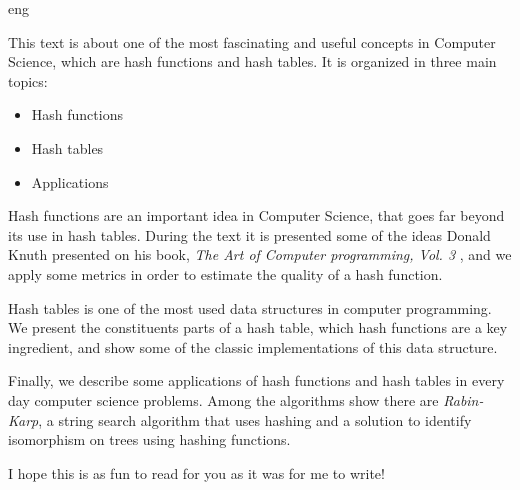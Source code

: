 \begin{resumo}{eng}
  
This text is about one of the most fascinating and useful concepts in Computer Science, which are hash functions and hash tables. It is organized in three main topics:

\begin{itemize}
   \item Hash functions
   \item Hash tables
   \item Applications
\end{itemize}

Hash functions are an important idea in Computer Science, that goes far beyond its use in hash tables. During the text it is presented some of the ideas Donald Knuth presented on his book, \textit{The Art of Computer programming, Vol. 3} \citep{TAOCP3}, and we apply some metrics in order to estimate the quality of a hash function.

Hash tables is one of the most used data structures in computer programming. We present the constituents parts of a hash table, which hash functions are a key ingredient, and show some of the classic implementations of this data structure. 

Finally, we describe some applications of hash functions and hash tables in every day computer science problems. Among the algorithms show there are \textit{Rabin-Karp}, a string search algorithm that uses hashing and a solution to identify isomorphism on trees using hashing functions.

I hope this is as fun to read for you as it was for me to write!
\\

\end{resumo}
